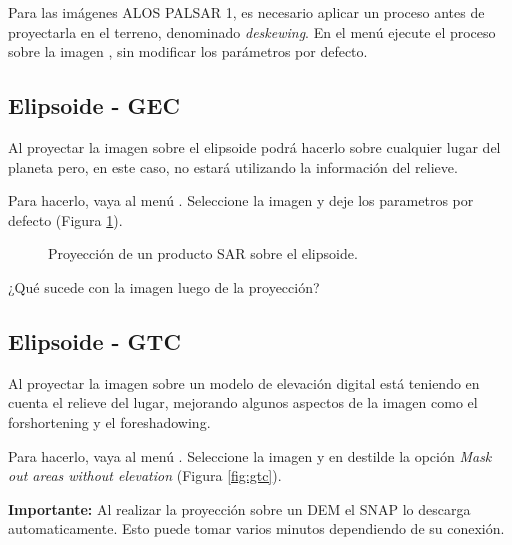 Para las imágenes ALOS PALSAR 1, es necesario aplicar un proceso antes de proyectarla en el terreno, denominado \emph{deskewing}. En el menú  ejecute el proceso sobre la imagen , sin modificar los parámetros por defecto.

\subsection{Elipsoide - GEC}

Al proyectar la imagen sobre el elipsoide podrá hacerlo sobre cualquier lugar del planeta pero, en este caso, no estará utilizando la información del relieve. %

Para hacerlo, vaya al menú . Seleccione la imagen  y deje los parametros por defecto (Figura \ref{fig:elipsoide}).

\begin{figure}[h!]
    \centering
    \hfill
    \caption{Proyección de un producto SAR sobre el elipsoide.}
    \label{fig:elipsoide}
\end{figure}

\begin{que}
    ¿Qué sucede con la imagen luego de la proyección?
\end{que}

\subsection{Elipsoide - GTC}

Al proyectar la imagen sobre un modelo de elevación digital está teniendo en cuenta el relieve del lugar, mejorando algunos aspectos de la imagen como el forshortening y el foreshadowing.

Para hacerlo, vaya al menú . Seleccione la imagen  y en  destilde la opción \emph{Mask out areas without elevation} (Figura \ref{fig:gtc}).

{\bf Importante:} Al realizar la proyección sobre un DEM el SNAP lo descarga automaticamente. Esto puede tomar varios minutos dependiendo de su conexión.

